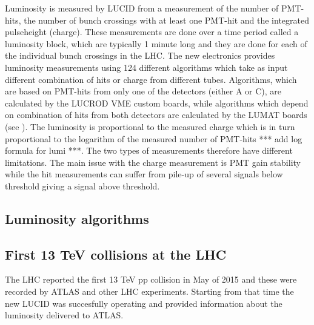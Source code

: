 Luminosity is measured by LUCID from a measurement of the number of PMT-hits, the number of bunch crossings 
with at least one PMT-hit and the integrated pulseheight (charge). These measurements are done over a time 
period called a luminosity block, which are typically 1 minute long and they are done for each of the 
individual bunch crossings in the LHC. 
The new electronics provides luminosity measurements using 124 different algorithms which take as input 
different combination of hits or charge from different tubes. Algorithms, which are based on PMT-hits from only 
one of the detectors (either A or C), are calculated by the LUCROD VME custom boards, while algorithms which depend on 
combination of hits from both detectors are calculated by the LUMAT boards (see 
).
The luminosity is proportional to the measured charge which is in turn proportional to the logarithm of the measured 
number of PMT-hits *** add log formula for lumi ***. The two types of measurements therefore have different limitations. 
The main issue with the 
charge measurement is PMT gain stability while the hit measurements can suffer from pile-up of several signals 
below threshold giving a signal above threshold.


\subsection{Luminosity algorithms}



\subsection{First 13 TeV collisions at the LHC}
\label{sec:physics}

The LHC reported the first 13 TeV pp collision in May of 2015 and these were recorded by ATLAS and other LHC 
experiments. 
Starting from that time the new LUCID was succesfully operating and provided information about the 
luminosity delivered to ATLAS. 


